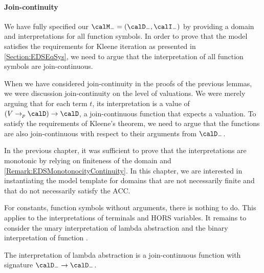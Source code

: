 \documentclass[../../diss.tex]{subfiles}
\begin{document}
\paragraph{Join-continuity}

We have fully specified our $\modelt = (\domaint,\interpretationt)$ by providing a domain and interpretations for all function symbols.
In order to prove that the model satisfies the requirements for Kleene iteration as presented in \cref{Section:EDSEqSys}, we need to argue that the interpretation of all function symbols are join-continuous.

When we have considered join-continuity in the proofs of the previous lemmas, we were discussion join-continuity on the level of valuations.
We were merely arguing that for each term $t$, its interpretation is a value of $(V \pto \domain) \to \domain$, \ie a join-continuous function that expects a valuation.
To satisfy the requirements of Kleene's theorem, we need to argue that the functions are also join-continuous with respect to their arguments from $\domaint$.

\begin{remark*}
In the previous chapter, it was sufficient to prove that the interpretations are monotonic by relying on finiteness of the domain and \cref{Remark:EDSMonotonocityContinuity}.
In this chapter, we are interested in instantiating the model template for domains that are not necessarily finite and that do not necessarily satisfy the ACC.\@
\end{remark*}

For constants, function symbols without arguments, there is nothing to do.
This applies to the interpretations of terminals and HORS variables.
It remains to consider the unary interpretation of lambda abstraction and the binary interpretation of function .

\begin{lemma}%
\label{Lemma:HORSTemplateLambdaJoinCont}%
    The interpretation of lambda abstraction is a join-continuous function with signature $\domaint \to \domaint$.
\end{lemma}
\end{document}

